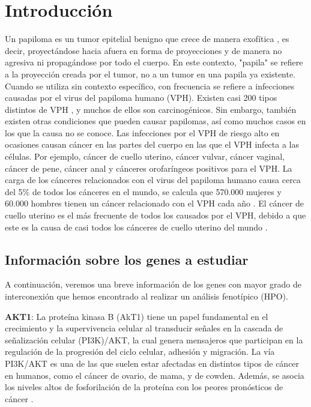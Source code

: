\section{Introducción}
Un papiloma es un tumor epitelial benigno que crece de manera exofítica \cite{Kozomara2007}, es decir, proyectándose hacia afuera en forma de proyecciones y de manera no agresiva ni propagándose por todo el cuerpo. En este contexto, "papila" se refiere a la proyección creada por el tumor, no a un tumor en una papila ya existente.
Cuando se utiliza sin contexto específico, con frecuencia se refiere a infecciones causadas por el virus del papiloma humano (VPH). Existen casi 200 tipos distintos de VPH \cite{Ljubojevic2014}, y muchos de ellos son carcinogénicos. Sin embargo, también existen otras condiciones que pueden causar papilomas, así como muchos casos en los que la causa no se conoce.
Las infecciones por el VPH de riesgo alto en ocasiones causan cáncer en las partes del cuerpo en las que el VPH infecta a las células. Por ejemplo, cáncer de cuello uterino, cáncer vulvar, cáncer vaginal, cáncer de pene, cáncer anal y cánceres orofaríngeos positivos para el VPH. La carga de los cánceres relacionados con el virus del papiloma humano causa cerca del 5\% \cite{papiloma} de todos los cánceres en el mundo, se calcula que 570.000 mujeres y 60.000 hombres tienen un cáncer relacionado con el VPH cada año \cite{papiloma} . El cáncer de cuello uterino es el más frecuente de todos los causados por el VPH, debido a que este es la causa de casi todos los cánceres de cuello uterino del mundo \cite{papiloma}.

\vspace{5pt}

\subsection{Información sobre los genes a estudiar} 
\vspace{3pt}
A continuación, veremos una breve información de los genes con mayor grado de interconexión que hemos encontrado al realizar un análisis fenotípico (HPO).

\vspace{3pt}

\textbf{AKT1}: La proteína kinasa B (AkT1) tiene un papel fundamental en el crecimiento y la supervivencia celular al transducir señales en la cascada de señalización celular (PI3K)/AKT, la cual genera mensajeros que participan en la regulación de la progresión del ciclo celular, adhesión y migración. La vía  PI3K/AKT es una de las que suelen estar afectadas en distintos tipos de cáncer en humanos, como el cáncer de ovario, de mama, y de cowden. Además, se asocia los niveles altos de fosforilación de la proteína con los peores pronósticos de cáncer \cite{Siegel2012}.

